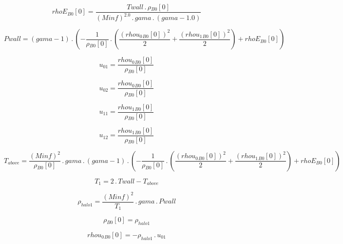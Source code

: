 \documentclass{article}
\begin{document}
\begin{dmath}{rhoE{_{B0}}}[{0}] = \frac{Twall \,.\, {\rho{_{B0}}}[{0}]}{\left(Minf \right)^{2.0} \,.\, gama \,.\, \left(gama - 1.0\right)}\end{dmath}

\begin{dmath}Pwall = \left(gama - 1\right) \,.\, \left(- \frac{1}{{\rho{_{B0}}}[{0}]} \,.\, \left(\frac{\left({rhou_{0}{_{B0}}}[{0}] \right)^{2}}{2} + \frac{\left({rhou_{1}{_{B0}}}[{0}] \right)^{2}}{2}\right) + {rhoE{_{B0}}}[{0}]\right)\end{dmath}

\begin{dmath}u_{01} = \frac{{rhou_{0}{_{B0}}}[{0}]}{{\rho{_{B0}}}[{0}]}\end{dmath}

\begin{dmath}u_{02} = \frac{{rhou_{0}{_{B0}}}[{0}]}{{\rho{_{B0}}}[{0}]}\end{dmath}

\begin{dmath}u_{11} = \frac{{rhou_{1}{_{B0}}}[{0}]}{{\rho{_{B0}}}[{0}]}\end{dmath}

\begin{dmath}u_{12} = \frac{{rhou_{1}{_{B0}}}[{0}]}{{\rho{_{B0}}}[{0}]}\end{dmath}

\begin{dmath}T_{above} = \frac{\left(Minf \right)^{2}}{{\rho{_{B0}}}[{0}]} \,.\, gama \,.\, \left(gama - 1\right) \,.\, \left(- \frac{1}{{\rho{_{B0}}}[{0}]} \,.\, \left(\frac{\left({rhou_{0}{_{B0}}}[{0}] \right)^{2}}{2} + 
\frac{\left({rhou_{1}{_{B0}}}[{0}] \right)^{2}}{2}\right) + {rhoE{_{B0}}}[{0}]\right)\end{dmath}

\begin{dmath}T_{1} = 2 \,.\, Twall - T_{above}\end{dmath}

\begin{dmath}\rho_{halo 1} = \frac{\left(Minf \right)^{2}}{T_{1}} \,.\, gama \,.\, Pwall\end{dmath}

\begin{dmath}{\rho{_{B0}}}[{0}] = \rho_{halo 1}\end{dmath}

\begin{dmath}{rhou_{0}{_{B0}}}[{0}] = - \rho_{halo 1} \,.\, u_{01}\end{dmath}
\end{document}
